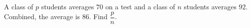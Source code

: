 A class of $p$ students averages $70$ on a test and a class of $n$ students averages $92$. Combined, the average is $86$. Find $\dfrac pn$.
